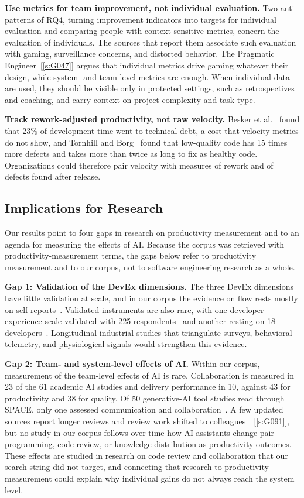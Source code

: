 \documentclass[preprint,number]{elsarticle}
\newcounter{study}
\newcommand{\refG}[1]{\ref{s:#1}}
\begin{document}
\textbf{Use metrics for team improvement, not individual evaluation.} Two anti-patterns of RQ4, turning improvement indicators into targets for individual evaluation and comparing people with context-sensitive metrics, concern the evaluation of individuals. The sources that report them associate such evaluation with gaming, surveillance concerns, and distorted behavior. The Pragmatic Engineer~[\refG{G047}] argues that individual metrics drive gaming whatever their design, while system- and team-level metrics are enough. When individual data are used, they should be visible only in protected settings, such as retrospectives and coaching, and carry context on project complexity and task type.

\textbf{Track rework-adjusted productivity, not raw velocity.} Besker et al.~\cite{P0485} found that 23\% of development time went to technical debt, a cost that velocity metrics do not show, and Tornhill and Borg~\cite{P0271} found that low-quality code has 15 times more defects and takes more than twice as long to fix as healthy code. Organizations could therefore pair velocity with measures of rework and of defects found after release.

\subsection{Implications for Research}

Our results point to four gaps in research on productivity measurement and to an agenda for measuring the effects of AI. Because the corpus was retrieved with productivity-measurement terms, the gaps below refer to productivity measurement and to our corpus, not to software engineering research as a whole.

\textbf{Gap 1: Validation of the DevEx dimensions.} The three DevEx dimensions~\cite{P1280} have little validation at scale, and in our corpus the evidence on flow rests mostly on self-reports~\cite{P0515, P0477}. Validated instruments are also rare, with one developer-experience scale validated with 225 respondents~\cite{P2102} and another resting on 18 developers~\cite{P0664}. Longitudinal industrial studies that triangulate surveys, behavioral telemetry, and physiological signals would strengthen this evidence.

\textbf{Gap 2: Team- and system-level effects of AI.} Within our corpus, measurement of the team-level effects of AI is rare. Collaboration is measured in 23 of the 61 academic AI studies and delivery performance in 10, against 43 for productivity and 38 for quality. Of 50 generative-AI tool studies read through SPACE, only one assessed communication and collaboration~\cite{P1816}. A few updated sources report longer reviews and review work shifted to colleagues~\cite{P2030, P2034}~[\refG{G091}], but no study in our corpus follows over time how AI assistants change pair programming, code review, or knowledge distribution as productivity outcomes. These effects are studied in research on code review and collaboration that our search string did not target, and connecting that research to productivity measurement could explain why individual gains do not always reach the system level.
\end{document}
